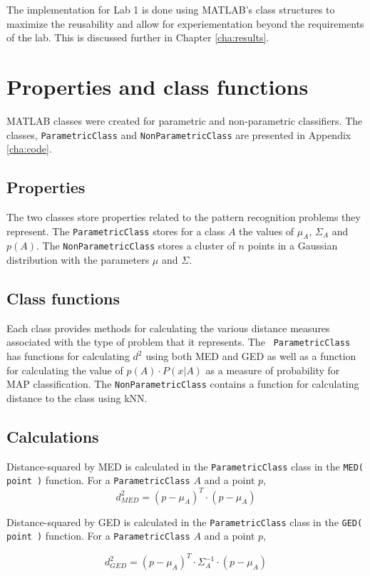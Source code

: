 The implementation for Lab 1 is done using MATLAB's class structures to
maximize the reusability and allow for experiementation beyond the requirements
of the lab. This is discussed further in Chapter \ref{cha:results}.

\section{Properties and class functions}
MATLAB classes were created for parametric and non-parametric classifiers. The
classes, {\tt ParametricClass} and {\tt NonParametricClass} are presented in
Appendix \ref{cha:code}.
\subsection{Properties}
The two classes store properties related to the pattern recognition problems
they represent. The {\tt ParametricClass} stores for a class $A$ the values of
$\mu_A$, $\Sigma_A$ and $p(A)$. The {\tt NonParametricClass} stores a cluster
of $n$ points in a Gaussian distribution with the parameters $\mu$
and $\Sigma$.

\subsection{Class functions}
Each class provides methods for calculating the various distance measures
associated with the type of problem that it represents. The {\tt
ParametricClass} has functions for calculating $d^2$ using both MED and GED as
well as a function for calculating the value of $p(A) \cdot P(x|A)$ as a
measure of probability for MAP classification. The {\tt NonParametricClass} contains a
function for calculating distance to the class using kNN.

\subsection{Calculations}
Distance-squared by MED is calculated in the {\tt ParametricClass} class in the
{\tt MED( point )} function. For a {\tt ParametricClass} $A$ and a point $p$,
\begin{equation}
d_{MED}^2 = (p - \mu_A)^T \cdot (p - \mu_A)
\end{equation}

Distance-squared by GED is calculated in the {\tt ParametricClass} class in the
{\tt GED( point )} function. For a {\tt ParametricClass} $A$ and a point $p$,

\begin{equation}
d_{GED}^2 = (p - \mu_A)^T \cdot \Sigma_A^{-1} \cdot (p - \mu_A)
\end{equation}

